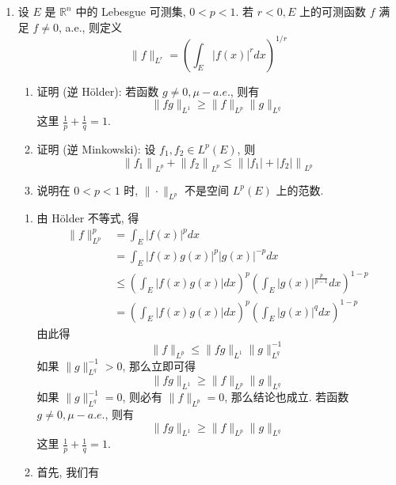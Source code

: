\begin{enumerate}
    \item 设 $E$ 是 $\mathbb{R}^{n}$ 中的 Lebesgue 可测集, $0<p<1$. 若 $r<0, E$ 上的可测函数 $f$ 满足 $f \neq  0$, a.e., 则定义
    \[
    \|f\|_{L^{r}}=\left(\int_{E}|f(x)|^{r} d x\right)^{1 / r}
    \]
        \begin{enumerate}
            \item  证明 (逆 Hölder): 若函数 $g \neq  0, \mu-a . e$., 则有
            \[
            \|f g\|_{L^{1}} \geq\|f\|_{L^{p}}\|g\|_{L^{q}}
            \]
            这里 $\frac{1}{p}+\frac{1}{q}=1$.
            \item 证明 (逆 Minkowski): 设 $f_{1}, f_{2} \in L^{p}(E)$, 则
            \[
            \left\|f_{1}\right\|_{L^{p}}+\left\|f_{2}\right\|_{L^{p}} \leq\left\|\left|f_{1}\right|+\left|f_{2}\right|\right\|_{L^{p}}
            \]
            \item 说明在 $0<p<1$ 时, $\|\cdot\|_{L^{p}}$ 不是空间 $L^{p}(E)$ 上的范数.
        \end{enumerate}
        \begin{answer}
            \begin{enumerate}
                \item 
                由 Hölder 不等式, 得
                \[
                \begin{aligned}
                \|f\|_{L^{p}}^{p} &=\int_{E}|f(x)|^{p} d x \\
                &=\int_{E}|f(x) g(x)|^{p}|g(x)|^{-p} d x \\
                & \leq\left(\int_{E}|f(x) g(x)| d x\right)^{p}\left(\int_{E}|g(x)|^{\frac{p}{p-1}} d x\right)^{1-p} \\
                &=\left(\int_{E}|f(x) g(x)| d x\right)^{p}\left(\int_{E}|g(x)|^{q} d x\right)^{1-p}
                \end{aligned}
                \]
                由此得
                \[
                \|f\|_{L^{p}} \leq\|f g\|_{L^{1}}\|g\|_{L^{q}}^{-1}
                \]
                如果 $\|g\|_{L^{q}}^{-1}>0$, 那么立即可得
                \[
                \|f g\|_{L^{1}} \geq\|f\|_{L^{p}}\|g\|_{L^{q}}
                \]
                如果 $\|g\|_{L^{q}}^{-1}=0$, 则必有 $\|f\|_{L^{p}}=0$, 那么结论也成立.
                若函数 $g \neq  0, \mu-a . e .$, 则有
                \[
                \|f g\|_{L^{1}} \geq\|f\|_{L^{p}}\|g\|_{L^{q}}
                \]
                这里 $\frac{1}{p}+\frac{1}{q}=1$.
                \item 首先, 我们有

\end{enumerate}
\end{answer}
\end{enumerate}
